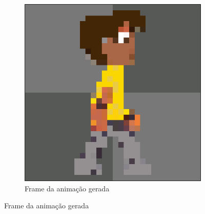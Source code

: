 \begin{figure}[htbp]
\begin{subfigure}{0.35\linewidth}
        \includegraphics[width=1\linewidth]{figs/pixelLab/dia4/print1.PNG}
        \caption{\small Frame da animação gerada}
        \label{fig:pixelLabAnimacao7b}
    \end{subfigure}
\end{figure}

